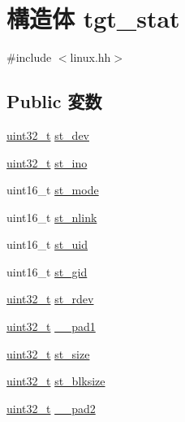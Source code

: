 \hypertarget{structArmLinux32_1_1tgt__stat}{
\section{構造体 tgt\_\-stat}
\label{structArmLinux32_1_1tgt__stat}
}


{\ttfamily \#include $<$linux.hh$>$}\subsection*{Public 変数}
\begin{DoxyCompactItemize}
\item 
\hyperlink{Type_8hh_a435d1572bf3f880d55459d9805097f62}{uint32\_\-t} \hyperlink{structArmLinux32_1_1tgt__stat_a96c0e3ea3acf24a90e33ed627147bf84}{st\_\-dev}
\item 
\hyperlink{Type_8hh_a435d1572bf3f880d55459d9805097f62}{uint32\_\-t} \hyperlink{structArmLinux32_1_1tgt__stat_a30ef9dc767fe6e3dca64f8fbf71af690}{st\_\-ino}
\item 
uint16\_\-t \hyperlink{structArmLinux32_1_1tgt__stat_a2ef4f1ded8823cb9518e3ab879c4d4df}{st\_\-mode}
\item 
uint16\_\-t \hyperlink{structArmLinux32_1_1tgt__stat_a57eca117f38b8e28cca30edc65cc6af8}{st\_\-nlink}
\item 
uint16\_\-t \hyperlink{structArmLinux32_1_1tgt__stat_a2fc914a09f2b0b59ef86f3fad7a66199}{st\_\-uid}
\item 
uint16\_\-t \hyperlink{structArmLinux32_1_1tgt__stat_a9aa9b26ed688142aa6287c9ec42ff0ba}{st\_\-gid}
\item 
\hyperlink{Type_8hh_a435d1572bf3f880d55459d9805097f62}{uint32\_\-t} \hyperlink{structArmLinux32_1_1tgt__stat_ac4a67c3d290b4f93d0d91b99776f4207}{st\_\-rdev}
\item 
\hyperlink{Type_8hh_a435d1572bf3f880d55459d9805097f62}{uint32\_\-t} \hyperlink{structArmLinux32_1_1tgt__stat_a95858c04e3640c0e2df56262dcadb875}{\_\-\_\-pad1}
\item 
\hyperlink{Type_8hh_a435d1572bf3f880d55459d9805097f62}{uint32\_\-t} \hyperlink{structArmLinux32_1_1tgt__stat_a0b83ab57b8d5de04bad49c03958fd7d7}{st\_\-size}
\item 
\hyperlink{Type_8hh_a435d1572bf3f880d55459d9805097f62}{uint32\_\-t} \hyperlink{structArmLinux32_1_1tgt__stat_a952cc52eb5efd16f9cebffe863823593}{st\_\-blksize}
\item 
\hyperlink{Type_8hh_a435d1572bf3f880d55459d9805097f62}{uint32\_\-t} \hyperlink{structArmLinux32_1_1tgt__stat_a028000613311d94d99bc2de4cab4b30b}{\_\-\_\-pad2}

\end{DoxyCompactItemize}
